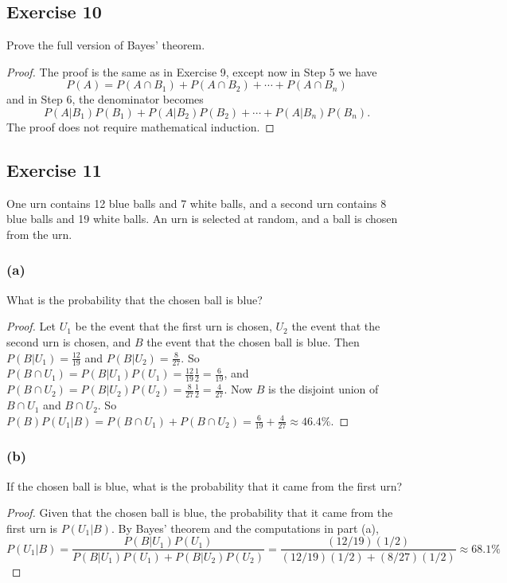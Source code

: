\documentclass[14pt]{extarticle}
\begin{document}
\subsection{Exercise 10}
Prove the full version of Bayes’ theorem.
\begin{proof}
     The proof is the same as in Exercise 9, except now in Step 5 we have
     \[
          P(A) = P(A \cap B_1) + P(A \cap B_2) + \cdots + P(A \cap B_n)
     \]
     and in Step 6, the denominator becomes
     \[
          P(A|B_1)P(B_1) + P(A|B_2)P(B_2) + \cdots + P(A|B_n)P(B_n).
     \]
     The proof does not require mathematical induction.
\end{proof}

\subsection{Exercise 11}
One urn contains 12 blue balls and 7 white balls, and a second urn contains 8 blue balls and 19 white balls. An urn is
selected at random, and a ball is chosen from the urn.

\subsubsection{(a)}
What is the probability that the chosen ball is blue?
\begin{proof}
     Let \(U_1\) be the event that the first urn is chosen, \(U_2\) the event that the second urn is chosen, and \(B\) the event
     that the chosen ball is blue. Then \(P(B|U_1) = \frac{12}{19}\) and \(P(B|U_2) = \frac{8}{27}\). So \(P(B \cap U_1) = P(B|
     U_1)P(U_1) = \frac{12}{19}\frac{1}{2} = \frac{6}{19}\), and \(P(B \cap U_2) = P(B|U_2)P(U_2) = \frac{8}{27}\frac{1}{2} =
     \frac{4}{27}\). Now \(B\) is the disjoint union of \(B \cap U_1\) and \(B \cap U_2\). So \(P(B)P(U_1|B) = P(B \cap U_1) +
     P(B \cap U_2) = \frac{6}{19} + \frac{4}{27} \approx 46.4\%\).
\end{proof}

\subsubsection{(b)}
If the chosen ball is blue, what is the probability that it came from the first urn?

\begin{proof}
     Given that the chosen ball is blue, the probability that it came from the first urn is \(P(U_1|B)\). By Bayes’ theorem and
     the computations in part (a),
     \[
          P(U_1|B) = \frac{P(B|U_1)P(U_1)}{P(B|U_1)P(U_1) + P(B|U_2)P(U_2)} = \frac{(12/19)(1/2)}{(12/19)(1/2) + (8/27)(1/2)}
          \approx 68.1\%
     \]
\end{proof}
\end{document}
